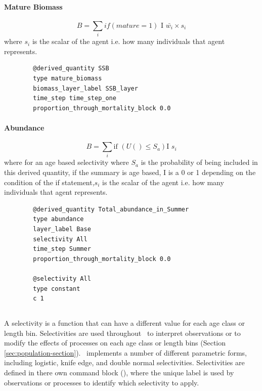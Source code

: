 \paragraph*{Mature Biomass}\label{para:mature_biomass}

\begin{equation}
B = \sum_i if(mature = 1)\text{ I } \bar{w_i} \times s_i
\end{equation}
where $s_i$ is the scalar of the agent i.e. how many individuals that agent represents.

{\small{\begin{verbatim}
		@derived_quantity SSB
		type mature_biomass
		biomass_layer_label SSB_layer
		time_step time_step_one
		proportion_through_mortality_block 0.0
\end{verbatim}}}
	
\paragraph*{Abundance}\label{para:abundance}

\begin{equation}
B = \sum_i \text{if }(U() \leq S_a)\text{I } s_i
\end{equation}
where for an age based selectivity where $S_a$ is the probability of being included in this derived quantity, if the summary is age based, I is a 0 or 1 depending on the condition of the if statement,$s_i$ is the scalar of the agent i.e. how many individuals that agent represents.
{\small{\begin{verbatim}
		@derived_quantity Total_abundance_in_Summer
		type abundance
		layer_label Base
		selectivity All
		time_step Summer
		proportion_through_mortality_block 0.0
		
		@selectivity All
		type constant
		c 1
\end{verbatim}}}


\subsection{\label{sec:selectivities}}
A selectivity is a function that can have a different value for each age class or length bin. Selectivities are used throughout \IBM\ to interpret observations or to modify the effects of processes on each age class or length bins (Section \ref{sec:population-section}). \IBM\ implements a number of different parametric forms, including logistic, knife edge, and double normal selectivities. Selectivities are defined in there own command block (), where the unique label is used by observations or processes to identify which selectivity to apply.

